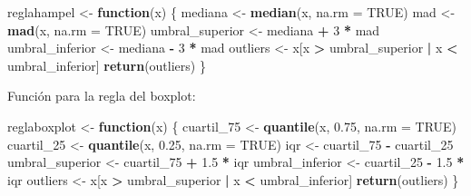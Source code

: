 \documentclass[
]{article}
\newenvironment{Shaded}{\begin{snugshade}}{\end{snugshade}}
\newcommand{\AttributeTok}[1]{\textcolor[rgb]{0.13,0.29,0.53}{#1}}
\newcommand{\ConstantTok}[1]{\textcolor[rgb]{0.56,0.35,0.01}{#1}}
\newcommand{\ControlFlowTok}[1]{\textcolor[rgb]{0.13,0.29,0.53}{\textbf{#1}}}
\newcommand{\DecValTok}[1]{\textcolor[rgb]{0.00,0.00,0.81}{#1}}
\newcommand{\FloatTok}[1]{\textcolor[rgb]{0.00,0.00,0.81}{#1}}
\newcommand{\FunctionTok}[1]{\textcolor[rgb]{0.13,0.29,0.53}{\textbf{#1}}}
\newcommand{\NormalTok}[1]{#1}
\newcommand{\OtherTok}[1]{\textcolor[rgb]{0.56,0.35,0.01}{#1}}
\newcommand{\SpecialCharTok}[1]{\textcolor[rgb]{0.81,0.36,0.00}{\textbf{#1}}}
\begin{document}
\begin{Shaded}
\begin{Highlighting}[]
\NormalTok{reglahampel }\OtherTok{\textless{}{-}} \ControlFlowTok{function}\NormalTok{(x) \{}
\NormalTok{  mediana }\OtherTok{\textless{}{-}} \FunctionTok{median}\NormalTok{(x, }\AttributeTok{na.rm =} \ConstantTok{TRUE}\NormalTok{)}
\NormalTok{  mad }\OtherTok{\textless{}{-}} \FunctionTok{mad}\NormalTok{(x, }\AttributeTok{na.rm =} \ConstantTok{TRUE}\NormalTok{)}
\NormalTok{  umbral\_superior }\OtherTok{\textless{}{-}}\NormalTok{ mediana }\SpecialCharTok{+} \DecValTok{3} \SpecialCharTok{*}\NormalTok{ mad}
\NormalTok{  umbral\_inferior }\OtherTok{\textless{}{-}}\NormalTok{ mediana }\SpecialCharTok{{-}} \DecValTok{3} \SpecialCharTok{*}\NormalTok{ mad}
\NormalTok{  outliers }\OtherTok{\textless{}{-}}\NormalTok{ x[x }\SpecialCharTok{\textgreater{}}\NormalTok{ umbral\_superior }\SpecialCharTok{|}\NormalTok{ x }\SpecialCharTok{\textless{}}\NormalTok{ umbral\_inferior]}
  \FunctionTok{return}\NormalTok{(outliers)}
\NormalTok{\}}
\end{Highlighting}
\end{Shaded}

Función para la regla del boxplot:

\begin{Shaded}
\begin{Highlighting}[]
\NormalTok{reglaboxplot }\OtherTok{\textless{}{-}} \ControlFlowTok{function}\NormalTok{(x) \{}
\NormalTok{  cuartil\_75 }\OtherTok{\textless{}{-}} \FunctionTok{quantile}\NormalTok{(x, }\FloatTok{0.75}\NormalTok{, }\AttributeTok{na.rm =} \ConstantTok{TRUE}\NormalTok{)}
\NormalTok{  cuartil\_25 }\OtherTok{\textless{}{-}} \FunctionTok{quantile}\NormalTok{(x, }\FloatTok{0.25}\NormalTok{, }\AttributeTok{na.rm =} \ConstantTok{TRUE}\NormalTok{)}
\NormalTok{  iqr }\OtherTok{\textless{}{-}}\NormalTok{ cuartil\_75 }\SpecialCharTok{{-}}\NormalTok{ cuartil\_25}
\NormalTok{  umbral\_superior }\OtherTok{\textless{}{-}}\NormalTok{ cuartil\_75 }\SpecialCharTok{+} \FloatTok{1.5} \SpecialCharTok{*}\NormalTok{ iqr}
\NormalTok{  umbral\_inferior }\OtherTok{\textless{}{-}}\NormalTok{ cuartil\_25 }\SpecialCharTok{{-}} \FloatTok{1.5} \SpecialCharTok{*}\NormalTok{ iqr}
\NormalTok{  outliers }\OtherTok{\textless{}{-}}\NormalTok{ x[x }\SpecialCharTok{\textgreater{}}\NormalTok{ umbral\_superior }\SpecialCharTok{|}\NormalTok{ x }\SpecialCharTok{\textless{}}\NormalTok{ umbral\_inferior]}
  \FunctionTok{return}\NormalTok{(outliers)}
\NormalTok{\}}
\end{Highlighting}
\end{Shaded}
\end{document}
